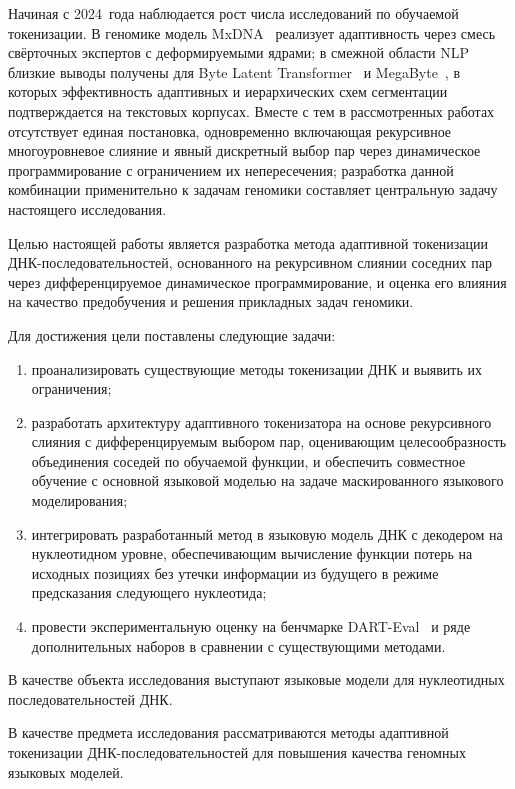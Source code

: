 Начиная с 2024~года наблюдается рост числа исследований по обучаемой
токенизации. В геномике модель MxDNA~\cite{qiaoMxDNAAdaptiveDNA2024}
реализует адаптивность через смесь свёрточных экспертов с
деформируемыми ядрами; в смежной области NLP близкие выводы получены
для Byte Latent Transformer~\cite{bltByteLatentTransformer2024} и
MegaByte~\cite{yuMegaBytePredictingMillionbyte2023}, в которых
эффективность адаптивных и иерархических схем сегментации
подтверждается на текстовых корпусах. Вместе с тем в рассмотренных
работах отсутствует единая постановка, одновременно включающая
рекурсивное многоуровневое слияние и явный дискретный выбор пар через
динамическое программирование с ограничением их непересечения;
разработка данной комбинации применительно к задачам геномики
составляет центральную задачу настоящего исследования.

Целью настоящей работы является разработка метода адаптивной
токенизации ДНК-последовательностей, основанного на рекурсивном
слиянии соседних пар через дифференцируемое динамическое
программирование, и оценка его влияния на качество предобучения и
решения прикладных задач геномики.

Для достижения цели поставлены следующие задачи:
\begin{enumerate}
  \item проанализировать существующие методы токенизации ДНК и
    выявить их ограничения;
  \item разработать архитектуру адаптивного токенизатора на основе
    рекурсивного слияния с дифференцируемым выбором пар, оценивающим
    целесообразность объединения соседей по обучаемой функции, и
    обеспечить совместное обучение с основной языковой моделью на
    задаче маскированного языкового моделирования;
  \item интегрировать разработанный метод в языковую модель ДНК с
    декодером на нуклеотидном уровне, обеспечивающим вычисление
    функции потерь на исходных позициях без утечки информации из
    будущего в режиме предсказания следующего нуклеотида;
  \item провести экспериментальную оценку на бенчмарке
    DART-Eval~\cite{patel2025dartevalcomprehensivednalanguage} и ряде
    дополнительных наборов в сравнении с существующими методами.
\end{enumerate}

В качестве объекта исследования выступают языковые модели для
нуклеотидных последовательностей ДНК.

В качестве предмета исследования рассматриваются методы адаптивной
токенизации ДНК-последовательностей для повышения качества геномных
языковых моделей.

